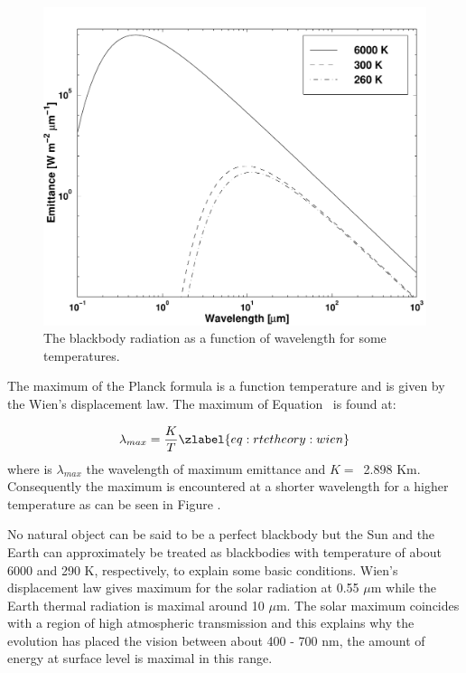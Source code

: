  \begin{figure}
  \begin{center}
   \includegraphics*[width=0.8\hsize]{fig_planck}
    \caption{The blackbody radiation as a function of wavelength for
             some temperatures.}
  \end{center}
 \end{figure}   
                                       
 The maximum of the Planck formula is a function temperature and is
 given by the Wien's displacement law. The maximum of
 Equation~ is found at: 

 \begin{equation}
   \lambda_{max} = \frac{K}{T}
  \zlabel{eq:rtetheory:wien}
 \end{equation}
 where is $\lambda_{max}$ the wavelength of maximum emittance and $K
 =$~2.898 Km. Consequently the maximum is encountered
 at a shorter wavelength for a higher temperature as can be seen in
 Figure .
                                     
 No natural object can be said to be a perfect blackbody but the Sun
 and the Earth can approximately be treated as blackbodies with
 temperature of about 6000 and 290 K, respectively, to explain some
 basic conditions. Wien's displacement law gives maximum for the solar
 radiation at 0.55 $\mu$m while the Earth thermal radiation is maximal
 around 10 $\mu$m. The solar maximum coincides with a region of high
 atmospheric transmission and this explains why the
 evolution has placed the vision between about 400 - 700 nm, the
 amount of energy at surface level is maximal in this range.  
 
